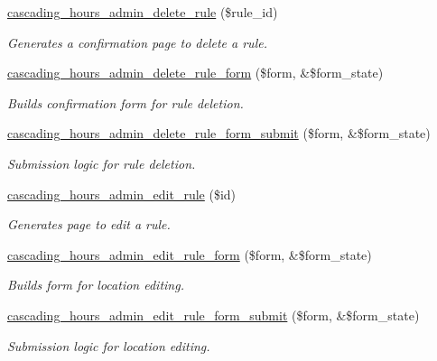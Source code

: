 \begin{DoxyCompactItemize}
\hyperlink{cascading__hours_8admin_8php_a31b87b732814d7f02f2e101376de5471_a31b87b732814d7f02f2e101376de5471}{cascading\+\_\+hours\+\_\+admin\+\_\+delete\+\_\+rule} (\$rule\+\_\+id)
\begin{DoxyCompactList}\small\item\em Generates a confirmation page to delete a rule. \end{DoxyCompactList}\item 
\hyperlink{cascading__hours_8admin_8php_a7940c215a217e5d798198fb4d0500e96_a7940c215a217e5d798198fb4d0500e96}{cascading\+\_\+hours\+\_\+admin\+\_\+delete\+\_\+rule\+\_\+form} (\$form, \&\$form\+\_\+state)
\begin{DoxyCompactList}\small\item\em Builds confirmation form for rule deletion. \end{DoxyCompactList}\item 
\hyperlink{cascading__hours_8admin_8php_a14427be08e46eaae79d5f5af58204187_a14427be08e46eaae79d5f5af58204187}{cascading\+\_\+hours\+\_\+admin\+\_\+delete\+\_\+rule\+\_\+form\+\_\+submit} (\$form, \&\$form\+\_\+state)
\begin{DoxyCompactList}\small\item\em Submission logic for rule deletion. \end{DoxyCompactList}\item 
\hyperlink{cascading__hours_8admin_8php_acb4b52112f97af8049d40a7f05956bd1_acb4b52112f97af8049d40a7f05956bd1}{cascading\+\_\+hours\+\_\+admin\+\_\+edit\+\_\+rule} (\$id)
\begin{DoxyCompactList}\small\item\em Generates page to edit a rule. \end{DoxyCompactList}\item 
\hyperlink{cascading__hours_8admin_8php_acfed64ec633bff9a42395c24c040f322_acfed64ec633bff9a42395c24c040f322}{cascading\+\_\+hours\+\_\+admin\+\_\+edit\+\_\+rule\+\_\+form} (\$form, \&\$form\+\_\+state)
\begin{DoxyCompactList}\small\item\em Builds form for location editing. \end{DoxyCompactList}\item 
\hyperlink{cascading__hours_8admin_8php_aed96ff9532714a4d9bcf48e63ff4d6c0_aed96ff9532714a4d9bcf48e63ff4d6c0}{cascading\+\_\+hours\+\_\+admin\+\_\+edit\+\_\+rule\+\_\+form\+\_\+submit} (\$form, \&\$form\+\_\+state)
\begin{DoxyCompactList}\small\item\em Submission logic for location editing. \end{DoxyCompactList}\item 

\end{DoxyCompactItemize}
